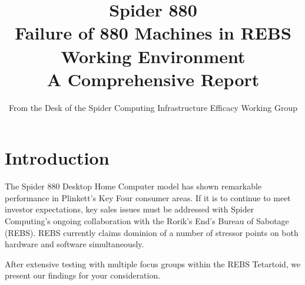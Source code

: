 \documentclass{article}
\title{
Spider 880 \\
\large Failure of 880 Machines in REBS Working Environment \\
A Comprehensive Report
}
\author{From the Desk of the Spider Computing Infrastructure Efficacy Working Group}
\date{}
\begin{document}
	\maketitle


\section{Introduction}
The Spider 880 Desktop Home Computer model has shown remarkable performance in Plinkett's Key Four consumer areas. If it is to continue to meet investor expectations, key sales issues must be addressed with Spider Computing's ongoing collaboration with the Rorik's End's Bureau of Sabotage (REBS). REBS currently claims dominion of a number of stressor points on both hardware and software simultaneously.

After extensive testing with multiple focus groups within the REBS Tetartoid, we present our findings for your consideration.
\end{document}
